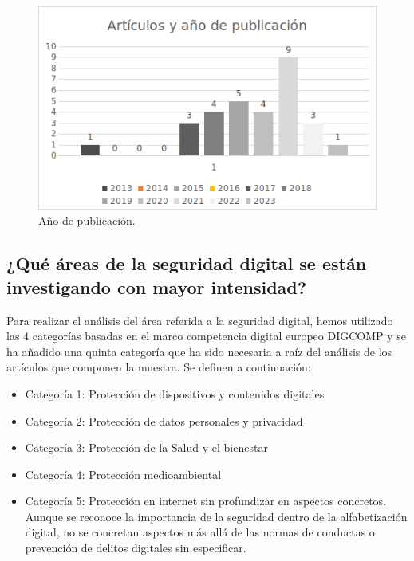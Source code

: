 \documentclass[spanish]{textolivre}
\begin{document}
\begin{figure}[h]
\centering
\begin{minipage}{0.75\textwidth}
\includegraphics[width=\textwidth]{Fig4.png}
\caption{Año de publicación.}
\label{fig4}
\end{minipage}
\end{figure}

\subsection{¿Qué áreas de la seguridad digital se están investigando con mayor intensidad?}\label{sec-modelo}
Para realizar el análisis del área referida a la seguridad digital, hemos utilizado las 4 categorías basadas en el marco competencia digital europeo DIGCOMP y se ha añadido una quinta categoría que ha sido necesaria a raíz del análisis de los artículos que componen la muestra. Se definen a continuación:

\begin{itemize}
    \item Categoría 1: Protección de dispositivos y contenidos digitales
    \item Categoría 2: Protección de datos personales y privacidad
    \item Categoría 3: Protección de la Salud y el bienestar
    \item Categoría 4: Protección medioambiental
    \item Categoría 5: Protección en internet sin profundizar en aspectos concretos. Aunque se reconoce la importancia de la seguridad dentro de la alfabetización digital, no se concretan aspectos más allá de las normas de conductas o prevención de delitos digitales sin especificar.
\end{itemize}
\end{document}
